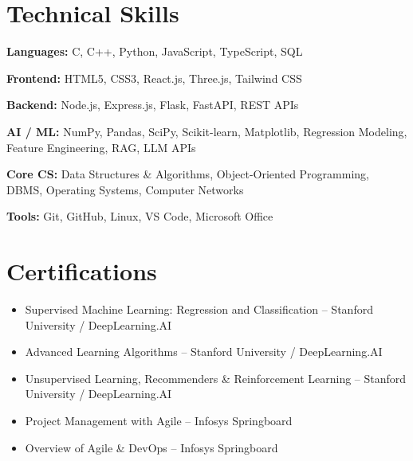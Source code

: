 \documentclass[10pt,a4paper]{article}
\begin{document}
\section*{Technical Skills}

\textbf{Languages:} C, C++, Python, JavaScript, TypeScript, SQL

\textbf{Frontend:} HTML5, CSS3, React.js, Three.js, Tailwind CSS

\textbf{Backend:} Node.js, Express.js, Flask, FastAPI, REST APIs

\textbf{AI / ML:} NumPy, Pandas, SciPy, Scikit-learn, Matplotlib, Regression Modeling, Feature Engineering, RAG, LLM APIs

\textbf{Core CS:} Data Structures \& Algorithms, Object-Oriented Programming, DBMS, Operating Systems, Computer Networks

\textbf{Tools:} Git, GitHub, Linux, VS Code, Microsoft Office

\section*{Certifications}

\begin{itemize}
\item Supervised Machine Learning: Regression and Classification -- Stanford University / DeepLearning.AI
\item Advanced Learning Algorithms -- Stanford University / DeepLearning.AI
\item Unsupervised Learning, Recommenders \& Reinforcement Learning -- Stanford University / DeepLearning.AI
\item Project Management with Agile -- Infosys Springboard
\item Overview of Agile \& DevOps -- Infosys Springboard
\end{itemize}
\end{document}
